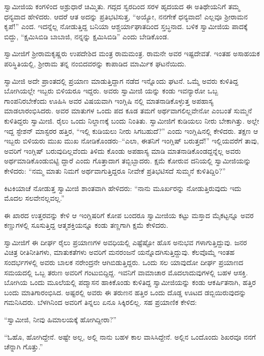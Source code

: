 ಸ್ವಾಮೀಜಿಯ ಕಂಗಳಿಂದ ಅಶ್ರುಧಾರೆ ಚಿಮ್ಮಿತು. ಗದ್ಗದ ಸ್ವರದಿಂದ ಸರಳ ಹೃದಯದ ಈ ಅತಿಥೇಯನಿಗೆ ತಮ್ಮ ಧನ್ಯವಾದ ಹೇಳಿದರು. ಆದರೆ ಆತ ಅದನ್ನು ಪ್ರತಿಭಟಿಸುತ್ತ, “ಅಯ್ಯೋ, ನನಗೇಕೆ ಧನ್ಯವಾದ! ಎಲ್ಲವೂ ಶ್ರೀರಾಮನ ಕೃಪೆ!” ಎಂದ. ಇದನ್ನೆಲ್ಲ ನೋಡುತ್ತಿದ್ದ ಬನಿಯಾ ಆಶ್ಚರ್ಯಾಘಾತದಿಂದ ಸ್ತಬ್ಧನಾದ. ಬಳಿಕ ಸ್ವಾಮೀಜಿಯ ಪಾದಕ್ಕೆ ಬಿದ್ದು, “ಕ್ಷಮಿಸಿಬಿಡಿ ಬಾಬಾಜಿ, ನನ್ನನ್ನು ಕ್ಷಮಿಸಿಬಿಡಿ” ಎಂದು ಬೇಡಿಕೊಂಡ.

ಸ್ವಾಮೀಜಿಗೆ ಶ್ರೀರಾಮಕೃಷ್ಣರು ಉಪದೇಶಿದ ಮಂತ್ರ ರಾಮಮಂತ್ರ. ರಾಮನೇ ಅವರ ಇಷ್ಟದೇವತೆ. ಇಂತಹ ಅಸಾಹಯಕ ಪರಿಸ್ಥಿತಿಯಲ್ಲಿ, ಶ್ರೀರಾಮ ತನ್ನ ನಂಬಿದವರನ್ನು ಕಾಪಾಡಿದ ಮಾರ್ಮಿಕ ಘಟನೆಯಿದು.

ಸ್ವಾಮೀಜಿ ಅದೇ ಪ್ರಾಂತದಲ್ಲಿ ಪ್ರಯಾಣ ಮಾಡುತ್ತಿದ್ದಾಗ ನಡೆದ ಇನ್ನೊಂದು ಘಟನೆ. ಒಮ್ಮೆ ಅವರು ಕುಳಿತಿದ್ದ ಬೋಗಿಯಲ್ಲೇ ಇಬ್ಬರು ಬಿಳಿಯರೂ ಇದ್ದರು. ಅವರು ಸ್ವಾಮೀಜಿ ಯನ್ನು ಕಂಡು ಇವನ್ಯಾರೋ ಒಬ್ಬ ಗಾಂಪನಿರಬೇಕೆಂದು ಊಹಿಸಿ ಅವರ ವಿಷಯವಾಗಿ ಇಂಗ್ಲಿಷಿ ನಲ್ಲಿ ಮಾತನಾಡಿಕೊಳ್ಳುತ್ತ ಅಪಹಾಸ್ಯ ಮಾಡಲಾರಂಭಿಸಿದರು. ಅವರ ಮಾತುಗಳ ಒಂದು ಪದ ಕೂಡ ತಮಗೆ ಅರ್ಥವಾಗಲಿಲ್ಲವೇನೋ ಎಂಬಂತೆ ಸುಮ್ಮನೆ ಕುಳಿತಿದ್ದರು ಸ್ವಾಮೀಜಿ. ರೈಲು ಒಂದು ನಿಲ್ದಾಣಕ್ಕೆ ಬಂದು ನಿಂತಿತು. ಸ್ವಾಮೀಜಿಗೆ ಕುಡಿಯಲು ನೀರು ಬೇಕಾಗಿತ್ತು. ಅಲ್ಲೇ ಇದ್ದ ಸ್ಟೇಶನ್ ಮಾಸ್ಟರರ ಹತ್ತಿರ, “ಇಲ್ಲಿ ಕುಡಿಯಲು ನೀರು ಸಿಗಬಹುದೆ?” ಎಂದು ಇಂಗ್ಲಿಷಿನಲ್ಲಿ ಕೇಳಿದರು. ತಕ್ಷಣ ಆ ಇಬ್ಬರು ಬಿಳಿಯರು ಮುಖ ಮುಖ ನೋಡಿಕೊಂಡರು–“ಎಲಾ, ಈತನಿಗೆ ಇಂಗ್ಲಿಷ್ ಬರುತ್ತದೆ!” ಇಲ್ಲಿಯವರೆಗೆ ತಾವು, ಅವರಿಗೆ ಇಂಗ್ಲಿಷ್ ಬರುವುದಿಲ್ಲವೆಂದು ತಿಳಿದು ಕೊಂಡು ಅಪಹಾಸ್ಯ ಮಾಡಿ ಮಾತನಾಡಿಕೊಂಡದ್ದನ್ನೆಲ್ಲ ಅವರು ಅರ್ಥಮಾಡಿಕೊಂಡುಬಿಟ್ಟಿ ದ್ದಾರೆ ಎಂದು ಗೊತ್ತಾದಾಗ ತಬ್ಬಿಬ್ಬಾದರು. ಕ್ಷಮೆ ಕೋರುವ ದನಿಯಲ್ಲಿ ಸ್ವಾಮೀಜಿಯನ್ನು ಕೇಳಿದರು: “ನಮ್ಮ ಮಾತು ನಿಮಗೆ ಅರ್ಥವಾಗುತ್ತಿದ್ದರೂ ನೀವೇಕೆ ಪ್ರತಿಭಟಿಸದೆ ಸುಮ್ಮನೆ ಕುಳಿತಿದ್ದಿರಿ?”

ಕಿಟಕಿಯಾಚೆ ನೋಡುತ್ತ ಸ್ವಾಮೀಜಿ ಶಾಂತವಾಗಿ ಹೇಳಿದರು: “ನಾನು ಮೂರ್ಖರನ್ನು ನೋಡುತ್ತಿರುವುದು ಇದು ಮೊದಲ ಸಲವೇನಲ್ಲವಲ್ಲ.”

ಈ ಖಾರದ ಉತ್ತರವನ್ನು ಕೇಳಿ ಆ ಇಂಗ್ಲಿಷರಿಗೆ ಕೋಪ ಬಂದರೂ ಸ್ವಾಮೀಜಿಯ ಕಟ್ಟು ಮಸ್ತಾದ ಮೈಕಟ್ಟನ್ನೂ ಅವರ ಕಣ್ಣುಗಳಲ್ಲಿ ಸೂಸುತ್ತಿದ್ದ ಆತ್ಮಶಕ್ತಿಯನ್ನೂ ಕಂಡು ತಣ್ಣಗಾಗಿ ಕ್ಷಮೆ ಕೇಳಿದರು.

ಸ್ವಾಮೀಜಿಗೆ ಈ ದೀರ್ಘ ರೈಲು ಪ್ರಯಾಣಗಳ ಅವಧಿಯಲ್ಲಿ ಎಷ್ಟೆಷ್ಟೋ ಹೊಸ ಅನುಭವ ಗಳಾಗುತ್ತಿದ್ದುವು. ಜನರ ವಿಚಿತ್ರ ರೀತಿನೀತಿಗಳು, ಮಾತುಕತೆಗಳು ಅವರಿಗೆ ಮನರಂಜನೆ ಯನ್ನೊದಗಿಸುತ್ತಿದ್ದುವು. ಕೆಲವೊಮ್ಮೆ ಇಂತಹ ಸಂದರ್ಭಗಳಲ್ಲಿ ಅವರು ಬಾಲಕ ನರೇಂದ್ರನೇ ಆಗಿಬಿಡುತ್ತಿದ್ದರು. ಒಂದು ಸಲ ಯಾವುದೋ ದೀರ್ಘ ಪ್ರಯಾಣದ ಸಮಯದಲ್ಲಿ ಒಬ್ಬ ತರುಣ ಅವರಿಗೆ ಗಂಟುಬಿದ್ದಿದ್ದ. ಇವನಿಗೆ ವಾಮಾಚಾರ ಮೊದಲಾದುವುಗಳಲ್ಲಿ ಬಹಳ ಆಸಕ್ತಿ. ಬೋಗಿಯ ಒಂದು ಮೂಲೆಯಲ್ಲಿ ಪದ್ಮಾಸನ ಹಾಕಿಕೊಂಡು ಕುಳಿತಿದ್ದ ಸ್ವಾಮೀಜಿಯನ್ನು ಕಂಡು ಆಕರ್ಷಿತನಾಗಿ, ಹತ್ತಿರ ಬಂದು ಮಾತಿಗಾರಂಭಿಸಿದ. ಅಷ್ಟರಲ್ಲಿ ಅವರು ಈ ತರುಣನ ಹತ್ತಿರ ಒಂದು ದೊಡ್ಡ ಊಟದ ಡಬ್ಬಿಯಿರುವುದನ್ನು ಗಮನಿಸಿದರು. ಬೆಳಗಿನಿಂದ ಅವರಿಗೆ ತಿನ್ನಲು ಏನೂ ಸಿಕ್ಕಿರಲಿಲ್ಲ. ಸಹ ಪ್ರಯಾಣಿಕ ಕೇಳಿದ:

“ಸ್ವಾಮೀಜಿ, ನೀವು ಹಿಮಾಲಯಕ್ಕೆ ಹೋಗಿದ್ದೀರಾ?”

“ಓಹೊ, ಹೋಗಿದ್ದೇನೆ. ಅಷ್ಟೇ ಅಲ್ಲ, ಅಲ್ಲಿ ನಾನು ಬಹಳ ಕಾಲ ವಾಸಿಸಿದ್ದೇನೆ. ಅಲ್ಲಿನ ಒಂದೊಂದು ಶಿಖರವೂ ನನಗೆ ಚೆನ್ನಾಗಿ ಗೊತ್ತು.”

